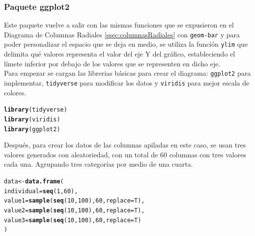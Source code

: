 \documentclass{article}\usepackage[]{graphicx}\usepackage[]{color}
\makeatletter
\newcommand{\hlnum}[1]{\textcolor[rgb]{0.686,0.059,0.569}{#1}}%
\newcommand{\hlstd}[1]{\textcolor[rgb]{0.345,0.345,0.345}{#1}}%
\newcommand{\hlkwb}[1]{\textcolor[rgb]{0.69,0.353,0.396}{#1}}%
\newcommand{\hlkwc}[1]{\textcolor[rgb]{0.333,0.667,0.333}{#1}}%
\newcommand{\hlkwd}[1]{\textcolor[rgb]{0.737,0.353,0.396}{\textbf{#1}}}%
\newenvironment{kframe}{%
 \def\at@end@of@kframe{}%
 \ifinner\ifhmode%
  \def\at@end@of@kframe{\end{minipage}}%
  \begin{minipage}{\columnwidth}%
 \fi\fi%
 \def\FrameCommand##1{\hskip\@totalleftmargin \hskip-\fboxsep
 \colorbox{shadecolor}{##1}\hskip-\fboxsep
     \hskip-\linewidth \hskip-\@totalleftmargin \hskip\columnwidth}%
 \MakeFramed {\advance\hsize-\width
   \@totalleftmargin\z@ \linewidth\hsize
   \@setminipage}}%
 {\par\unskip\endMakeFramed%
 \at@end@of@kframe}
\newenvironment{knitrout}{}{} %
\makeatother
\begin{document}
\subsubsection{Paquete ggplot2}
Este paquete \cite{docu_ggplot2}
vuelve a salir con las mismas funciones que se expusieron en el Diagrama de Columnas Radiales \autoref{ssec:columnasRadiales}
con \texttt{geom-bar} y para poder personalizar el espacio que se deja en medio, se utiliza la funci\'on \texttt{ylim} que delimita qu\'e valores representa el valor del eje Y del gr\'afico, estableciendo el l\'imete inferior por debajo de los valores que se representen en dicho eje.~\\
Para empezar se cargan las librerias b\'asicas para crear el diagrama: \texttt{ggplot2} para implementar, \texttt{tidyverse} \cite{docu_tidyverse}
 para modificar los datos y \texttt{viridis} \cite{docu_viridis}
 para mejor escala de colores.
\begin{knitrout}
\color{fgcolor}\begin{kframe}
\begin{alltt}
\hlkwd{library}\hlstd{(tidyverse)}
\hlkwd{library}\hlstd{(viridis)}
\hlkwd{library}\hlstd{(ggplot2)}
\end{alltt}
\end{kframe}
\end{knitrout}
Despu\'es, para crear los datos de las columnas apiladas en este caso, se usan tres valores generados con aleatoriedad, con un total de 60 columnas con tres valores cada una. Agrupando tres categor\'ias por medio de una cuarta.
\begin{knitrout}
\color{fgcolor}\begin{kframe}
\begin{alltt}
\hlstd{data} \hlkwb{<-} \hlkwd{data.frame}\hlstd{(}
  \hlkwc{individual}\hlstd{=}\hlkwd{seq}\hlstd{(}\hlnum{1}\hlstd{,}\hlnum{60}\hlstd{),}
  \hlkwc{value1}\hlstd{=}\hlkwd{sample}\hlstd{(} \hlkwd{seq}\hlstd{(}\hlnum{10}\hlstd{,}\hlnum{100}\hlstd{),} \hlnum{60}\hlstd{,} \hlkwc{replace}\hlstd{=T),}
  \hlkwc{value2}\hlstd{=}\hlkwd{sample}\hlstd{(} \hlkwd{seq}\hlstd{(}\hlnum{10}\hlstd{,}\hlnum{100}\hlstd{),} \hlnum{60}\hlstd{,} \hlkwc{replace}\hlstd{=T),}
  \hlkwc{value3}\hlstd{=}\hlkwd{sample}\hlstd{(} \hlkwd{seq}\hlstd{(}\hlnum{10}\hlstd{,}\hlnum{100}\hlstd{),} \hlnum{60}\hlstd{,} \hlkwc{replace}\hlstd{=T)}
\hlstd{)}
\end{alltt}
\end{kframe}
\end{knitrout}
\end{document}
